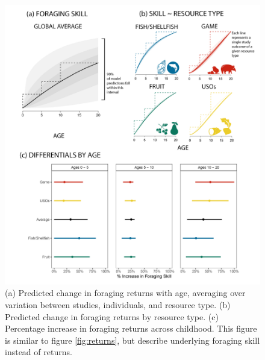 \begin{figure}[h]
\centering
\includegraphics[width=12cm] {text/images/supplementary/by_resource_supp_skill.png}
\renewcommand{\thefigure}{S\arabic{figure}}
\caption{(a) Predicted change in foraging returns with age, averaging over variation between studies, individuals, and resource type. (b) Predicted change in foraging returns by resource type. (c) Percentage increase in foraging returns across childhood. This figure is similar to figure \ref{fig:returns}, but describe underlying foraging skill instead of returns.}
\label{fig:skill}
\end{figure}

